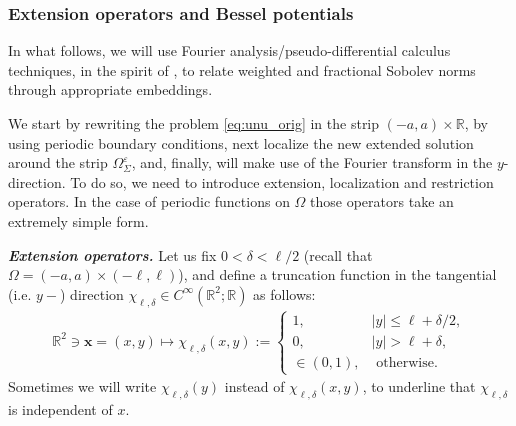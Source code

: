 \documentclass[report]{elsarticle}
\numberwithin{theorem}{section}
\renewcommand{\vec}[1]{\mathbf{#1}}
\begin{document}
\subsubsection{{Extension operators and Bessel potentials}}
\label{sec:extension_bessel}
In what follows, we will use Fourier analysis/pseudo-differential calculus techniques, in the spirit of \cite{baouendi_goulaouic}, to relate weighted and fractional Sobolev norms through appropriate embeddings. 

We start by rewriting the problem \eqref{eq:unu_orig} in the strip $(-a,a)\times \mathbb{R}$, by using periodic boundary conditions, next localize the new extended solution around the strip $\Omega_{\Sigma}^{\varepsilon}$, and, finally, will make use of the Fourier transform in the $y$-direction. To do so, we need to introduce extension, localization and restriction operators. In the case of periodic functions on $\Omega$ those operators take an extremely simple form. 


\textit{\textbf{Extension operators. }}Let us fix $0<\delta<\ell/2$ (recall that $\Omega=(-a,a)\times (-\ell,\ell)$), and define a truncation function in the tangential (i.e. $y-$) direction  $\chi_{\ell,\delta}\in C^{\infty}( \mathbb{R}^2;\mathbb{R})$ as follows:
\begin{align}
	\label{eq:childelta}
	\mathbb{R}^2\ni \vec{x}=(x,y)\mapsto	\chi_{\ell,\delta}(x,y):=\left\{
	\begin{array}{ll}
		1, & |y|\leq \ell+\delta/2, \\
		0,& |y|>\ell+\delta, \\
		\in (0,1), & \text{ otherwise. }
	\end{array}	\right.
\end{align}
Sometimes we will write $\chi_{\ell,\delta}(y)$ instead of $\chi_{\ell,\delta}(x,y)$, to underline that $\chi_{\ell,\delta}$ is independent of $x$.  
\end{document}

